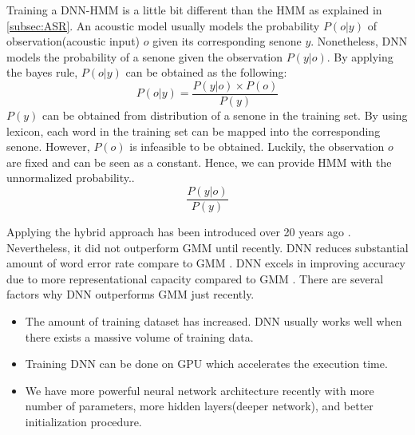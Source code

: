 Training a DNN-HMM is a little bit different than the HMM as explained in \ref{subsec:ASR}. An acoustic model usually models the probability $P(o|y)$ of observation(acoustic input) $o$ given its corresponding senone $y$. Nonetheless, DNN models the probability of a senone given the observation $P(y|o)$. By applying the bayes rule, $P(o|y)$ can be obtained as the following:
\begin{equation}
P(o|y)  = \frac{P(y|o) \times P(o)}{P(y)}
\end{equation}
$P(y)$ can be obtained from distribution of a senone in the training set. By using lexicon, each word in the training set can be mapped into the corresponding senone. However, $P(o)$ is infeasible to be obtained. Luckily, the observation $o$ are fixed and can be seen as a constant. Hence, we can provide HMM with the unnormalized probability..
\begin{equation}
\frac{P(y|o) }{P(y)}
\end{equation}

Applying the hybrid approach has been introduced over 20 years ago \cite{Bourlard:1993:CSR:562393,Renals1994}. Nevertheless, it did not outperform GMM until recently. DNN reduces substantial amount of word error rate compare to GMM \cite{Dahl2011,38130}. DNN excels in improving accuracy due to more representational capacity compared to GMM \cite{1406.7806}. There are several factors why DNN outperforms GMM just recently.
\begin{itemize}
\item The amount of training dataset has increased. DNN usually works well when there exists a massive volume of training data.
\item Training DNN can be done on GPU which accelerates the execution time. 
\item We have more powerful neural network architecture recently with more number of parameters, more hidden layers(deeper network), and better initialization procedure. 
\end{itemize}




